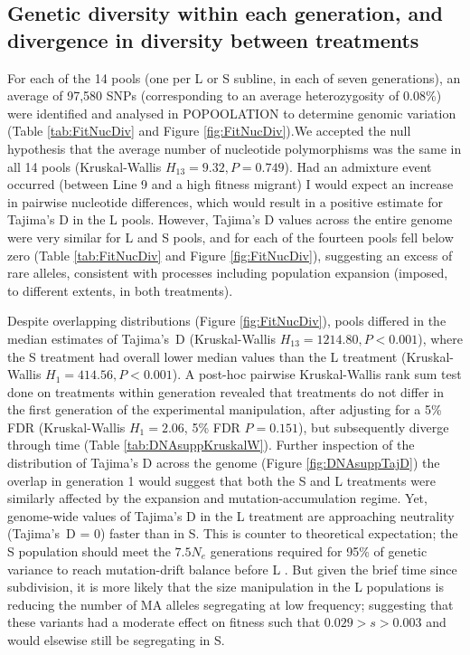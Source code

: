 \subsection{Genetic diversity within each generation, and divergence in diversity between treatments}
For each of the 14 pools (one per L or S subline, in each of seven generations), an average of 97,580 SNPs (corresponding to an average heterozygosity of 0.08\%) were identified and analysed in POPOOLATION to determine genomic variation (Table \ref{tab:FitNucDiv} and Figure \ref{fig:FitNucDiv}).We accepted the null hypothesis that the average number of nucleotide polymorphisms was the same in all 14 pools (Kruskal-Wallis $H_{13} = 9.32, P = 0.749$). Had an admixture event occurred (between Line 9 and a high fitness migrant) I would expect an increase in pairwise nucleotide differences, which would result in a positive estimate for Tajima’s D in the L pools. However, Tajima’s D values across the entire genome were very similar for L and S pools, and for each of the fourteen pools fell below zero (Table \ref{tab:FitNucDiv} and Figure \ref{fig:FitNucDiv}), suggesting an excess of rare alleles, consistent with processes including population expansion (imposed, to different extents, in both treatments).\par

Despite overlapping distributions (Figure \ref{fig:FitNucDiv}), pools differed in the median estimates of Tajima’s~D (Kruskal-Wallis $H_{13} = 1214.80, P < 0.001$), where the S treatment had overall lower median values than the L treatment (Kruskal-Wallis $H_1 = 414.56, P < 0.001$). A post-hoc pairwise Kruskal-Wallis rank sum test done on treatments within generation revealed that treatments do not differ in the first generation of the experimental manipulation, after adjusting for a 5\% FDR (Kruskal-Wallis $H_1 = 2.06$, 5\% FDR $P = 0.151$), but subsequently diverge through time (Table \ref{tab:DNAsuppKruskalW}). Further inspection of the distribution of Tajima’s D across the genome (Figure \ref{fig:DNAsuppTajD}) the overlap in generation 1 would suggest that both the S and L treatments were similarly affected by the expansion and mutation-accumulation regime. Yet, genome-wide values of Tajima’s D in the L treatment are approaching neutrality (Tajima’s~D = 0) faster than in S. This is counter to theoretical expectation; the S population should meet the $7.5N_e$ generations required for 95\% of genetic variance to reach mutation-drift balance before L \citep{Lync86}. But given the brief time since subdivision, it is more likely that the size manipulation in the L populations is reducing the number of MA alleles segregating at low frequency; suggesting that these variants had a moderate effect on fitness such that $0.029 > s > 0.003$ and would elsewise still be segregating in S. \par

